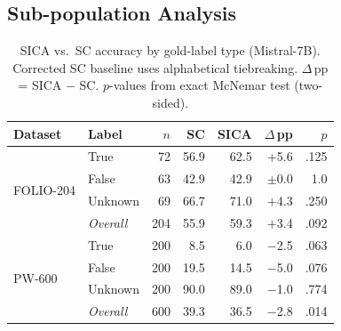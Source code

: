 
\subsection{Sub-population Analysis}
\label{app:subpopulation}

\begin{table}[h]
\centering
\small
\caption{SICA vs.\ SC accuracy by gold-label type (Mistral-7B). Corrected SC baseline uses alphabetical tiebreaking. $\Delta$\,pp = SICA $-$ SC. $p$-values from exact McNemar test (two-sided).}
\label{tab:subpop-answer-type}
\begin{tabular}{ll rrr rr}
\toprule
\textbf{Dataset} & \textbf{Label} & $n$ & \textbf{SC} & \textbf{SICA} & $\Delta$\,pp & $p$ \\
\midrule
\multirow{4}{*}{FOLIO-204}
 & True    &  72 & 56.9 & 62.5 & $+$5.6 & .125 \\
 & False   &  63 & 42.9 & 42.9 & $\pm$0.0 & 1.0\hphantom{00} \\
 & Unknown &  69 & 66.7 & 71.0 & $+$4.3 & .250 \\
 & \textit{Overall} & 204 & 55.9 & 59.3 & $+$3.4 & .092 \\
\midrule
\multirow{4}{*}{PW-600}
 & True    & 200 &  8.5 &  6.0 & $-$2.5 & .063 \\
 & False   & 200 & 19.5 & 14.5 & $-$5.0 & .076 \\
 & Unknown & 200 & 90.0 & 89.0 & $-$1.0 & .774 \\
 & \textit{Overall} & 600 & 39.3 & 36.5 & $-$2.8 & .014\rlap{*} \\
\bottomrule
\end{tabular}
\end{table}

